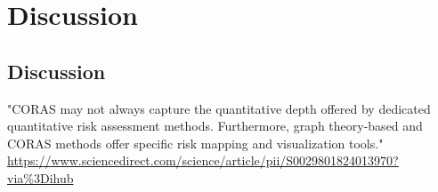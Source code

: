 \chapter{Discussion}
\section{Discussion}

"CORAS may not always capture the quantitative depth offered by dedicated quantitative risk assessment methods. Furthermore, graph theory-based and CORAS methods offer specific risk mapping and visualization tools." 
\url{https://www.sciencedirect.com/science/article/pii/S0029801824013970?via%3Dihub}